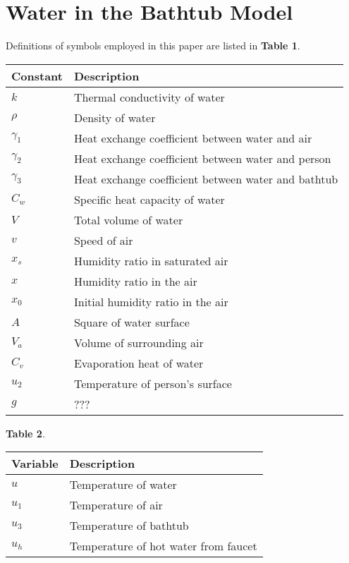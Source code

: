 \documentclass[12pt,a4paper,titlepage]{article}
\begin{document}
\section{Water in the Bathtub Model}
\label{sec:human-capital-model}
Definitions of symbols employed in this paper are listed in
\textbf{Table 1}.
\begin{table}
\begin{tabular}{l|l}
  Constant & Description \\
  \hline
  $k$            &Thermal conductivity of water \\
  $\rho$         &Density of water \\
  ${\gamma}_1$   &Heat exchange coefficient between water and air \\
  ${\gamma}_2$   &Heat exchange coefficient between water and person \\
  ${\gamma}_3$   &Heat exchange coefficient between water and bathtub \\
  $C_w$          &Specific heat capacity of water \\
  $V$            &Total volume of water \\
  $v$            &Speed of air\\
  $x_s$          &Humidity ratio in saturated air \\
  $x$            &Humidity ratio in the air \\
  $x_0$          &Initial humidity ratio in the air \\
  $A$            &Square of water surface \\
  $V_a$          &Volume of surrounding air \\
  $C_v$          &Evaporation heat of water \\
  $u_2$          &Temperature of person's surface \\
  $g$            &???\\
\end{tabular}
\end{table}

\textbf{Table 2}.
\begin{table}
\begin{tabular}{l|l}
  Variable & Description \\
  \hline
  $u$            &Temperature of water \\
  $u_1$          &Temperature of air \\
  $u_3$          &Temperature of bathtub \\
  $u_h$          &Temperature of hot water from faucet \\
\end{tabular}
\end{table}
\end{document}
